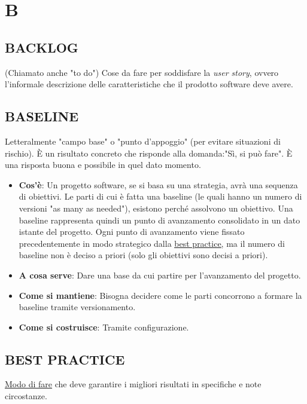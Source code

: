 \newpage
	\flushright{\hyperref[index]{\color{black!65}{Ritorna all'indice}}}\flushleft
	\section{B} \label{sec:B}
	
		\subsection{BACKLOG}  \label{backlog}
		(Chiamato anche "to do") Cose da fare per soddisfare la \textit{user story}, ovvero l'informale descrizione delle caratteristiche che il prodotto software deve avere.
		
		
		\subsection{BASELINE}   \label{baseline} 
		Letteralmente "campo base" o "punto d'appoggio" (per evitare situazioni di rischio). È un risultato concreto che risponde alla domanda:"Sì, si può fare". È una risposta buona e possibile in quel dato momento.
		\begin{itemize}
			\item \textbf{Cos'è}: Un progetto software, se si basa su una strategia, avrà una sequenza di obiettivi. Le parti di cui è fatta una baseline (le quali hanno un numero di versioni "as many as needed"), esistono perché assolvono un obiettivo. Una baseline rappresenta quindi un punto di avanzamento consolidato in un dato istante del progetto. Ogni punto di avanzamento viene fissato precedentemente in modo strategico dalla \underline{\hyperref[best]{best practice}}, ma il numero di baseline non è deciso a priori (solo gli obiettivi sono decisi a priori). 
			\item \textbf{A cosa serve}: Dare una base da cui partire per l'avanzamento del progetto.
			\item \textbf{Come si mantiene}: Bisogna decidere come le parti concorrono a formare la baseline tramite versionamento.
			\item \textbf{Come si costruisce}: Tramite configurazione.
		\end{itemize}
		
		
		\subsection{BEST PRACTICE}  \label{best}
		\underline{\hyperref[way]{Modo di fare}} che deve garantire i migliori risultati in specifiche e note circostanze.
		
